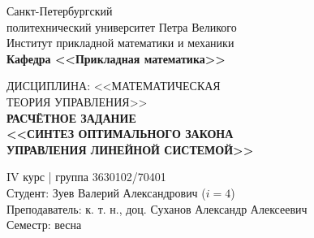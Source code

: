 \documentclass[zuev_lab1.tex]{subfiles}
\begin{document}
\begin{titlepage}
\begin{center}
	\begin{large}
		Санкт-Петербургский \\
        политехнический университет Петра Великого\\
		Институт прикладной математики и механики\\
		\textbf{Кафедра <<Прикладная математика>>}\\
	\end{large}
	\vfill
	\Large{
    ДИСЦИПЛИНА: <<МАТЕМАТИЧЕСКАЯ \\
    ТЕОРИЯ УПРАВЛЕНИЯ>> \\
    \textbf{
    РАСЧЁТНОЕ ЗАДАНИЕ  \\
	<<СИНТЕЗ ОПТИМАЛЬНОГО ЗАКОНА \\
    УПРАВЛЕНИЯ ЛИНЕЙНОЙ СИСТЕМОЙ>>
	}}
\end{center}
\vfill
\flushright
IV курс | группа 3630102/70401 \\
Студент: Зуев Валерий Александрович ($ i = 4 $)\\
Преподаватель: к. т. н., доц. Суханов Александр Алексеевич \\
Семестр: весна
\vfill
{}
\end{titlepage}
\end{document}

